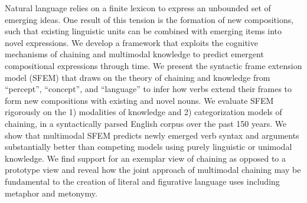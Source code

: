 Natural language relies on a finite lexicon to express an unbounded set of emerging ideas. One result of this tension is the formation of new compositions, such that existing linguistic units can be combined with emerging items into novel expressions. We develop a framework that exploits the cognitive mechanisms of chaining and multimodal knowledge to predict emergent compositional expressions through time. We present the syntactic frame extension model (SFEM) that draws on the theory of chaining and knowledge from ``percept'', ``concept'', and ``language'' to infer how verbs extend their frames to form new compositions with existing and novel nouns. We evaluate SFEM rigorously on the 1) modalities of knowledge and 2) categorization models of chaining, in a syntactically parsed  English corpus over the past 150 years. We show that multimodal SFEM predicts newly emerged verb syntax and arguments substantially better than competing models using purely linguistic or unimodal knowledge. We  find support for an exemplar view of chaining as opposed to a prototype view and reveal how the joint approach of multimodal chaining may be fundamental to the creation of literal and figurative language uses including metaphor and metonymy.
